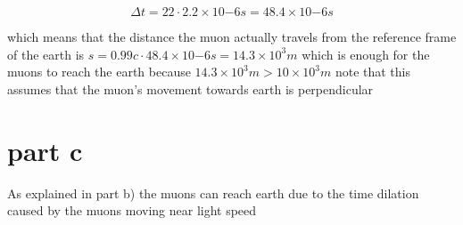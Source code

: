 \documentclass[12pt,a4paper]{article}
\begin{document}
\begin{equation} \label{}
\Delta t=22\cdot2.2\times10{-6}\si{s}=48.4\times10{-6}\si{s}
\end{equation}

which means that the distance the muon actually travels from the reference frame of the earth is \begin{math}
s=0.99c\cdot48.4\times10{-6}\si{s}=14.3\times10^{3}m
\end{math} which is enough for the muons to reach the earth because \begin{math}
14.3\times10^{3}\si{m} > 10\times10^{3}\si{m} 
\end{math}
note that this assumes that the muon's movement towards earth is perpendicular
\section{part c}

As explained in part b) the muons can reach earth due to the time dilation caused by the muons moving near light speed
\end{document}

